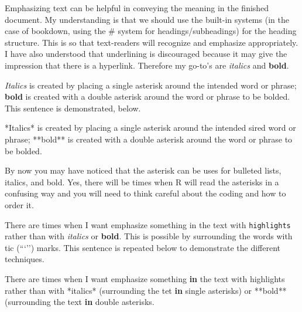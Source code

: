 \documentclass[
]{book}
\newenvironment{Shaded}{\begin{snugshade}}{\end{snugshade}}
\newcommand{\AttributeTok}[1]{\textcolor[rgb]{0.77,0.63,0.00}{#1}}
\newcommand{\ControlFlowTok}[1]{\textcolor[rgb]{0.13,0.29,0.53}{\textbf{#1}}}
\newcommand{\NormalTok}[1]{#1}
\newcommand{\SpecialCharTok}[1]{\textcolor[rgb]{0.00,0.00,0.00}{#1}}
\newcommand{\StringTok}[1]{\textcolor[rgb]{0.31,0.60,0.02}{#1}}
\begin{document}
Emphasizing text can be helpful in conveying the meaning in the finished document. My understanding is that we should use the built-in systems (in the case of bookdown, using the \# system for headings/subheadings) for the heading structure. This is so that text-readers will recognize and emphasize appropriately. I have also understood that underlining is discouraged because it may give the impression that there is a hyperlink. Therefore my go-to's are \emph{italics} and \textbf{bold}.

\emph{Italics} is created by placing a single asterisk around the intended word or phrase; \textbf{bold} is created with a double asterisk around the word or phrase to be bolded. This sentence is demonstrated, below.

\begin{Shaded}
\begin{Highlighting}[]
\SpecialCharTok{*}\NormalTok{Italics}\SpecialCharTok{*}\NormalTok{ is created by placing a single asterisk around the intended sired word or phrase; }\SpecialCharTok{**}\NormalTok{bold}\SpecialCharTok{**}\NormalTok{ is created with a double asterisk around the word or phrase to be bolded.}
\end{Highlighting}
\end{Shaded}

By now you may have noticed that the asterisk can be uses for bulleted lists, italics, and bold. Yes, there will be times when R will read the asterisks in a confusing way and you will need to think careful about the coding and how to order it.

There are times when I want emphasize something in the text with \texttt{highlights} rather than with \emph{italics} or \textbf{bold}. This is possible by surrounding the words with tic (```'') marks. This sentence is repeated below to demonstrate the different techniques.

\begin{Shaded}
\begin{Highlighting}[]
\NormalTok{There are times when I want emphasize something }\ControlFlowTok{in}\NormalTok{ the text with }\StringTok{\textasciigrave{}}\AttributeTok{highlights}\StringTok{\textasciigrave{}}\NormalTok{ rather than with }\SpecialCharTok{*}\NormalTok{italics}\SpecialCharTok{*}\NormalTok{ (surrounding the tet }\ControlFlowTok{in}\NormalTok{ single asterisks) or }\SpecialCharTok{**}\NormalTok{bold}\SpecialCharTok{**}\NormalTok{ (surrounding the text }\ControlFlowTok{in}\NormalTok{ double asterisks.}
\end{Highlighting}
\end{Shaded}
\end{document}
